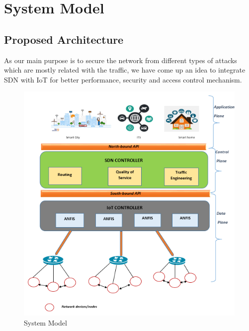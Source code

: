 \chapter{System Model}
\section{Proposed Architecture}


As our main purpose is to secure the network from different types of attacks which are mostly related with the traffic, we have come up an idea to integrate SDN with IoT for better performance, security and access control mechanism.

\begin{figure}[ht]
   \centering
   \includegraphics[width=5.5in]{Chap3/proposedmodel.png}
   \caption{System Model}
   \label{fig:model}
\end{figure}




